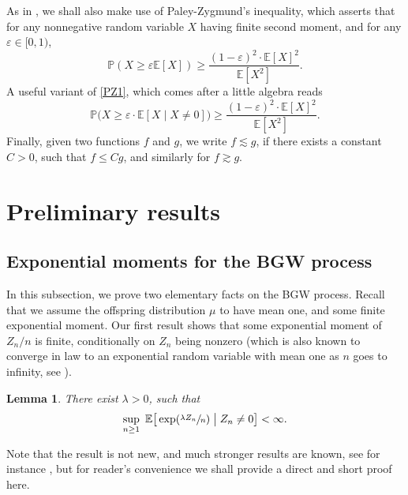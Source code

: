 \documentclass[11pt]{article}
\numberwithin{equation}{section}
\theoremstyle{plain}
\newtheorem{lemma}[theorem]{Lemma}
\theoremstyle{definition}
\newcommand{\1}{{\text{\Large $\mathfrak 1$}}}
\begin{document}
As in \cite{AHJ}, we shall also make use of Paley-Zygmund's inequality, which asserts that for any nonnegative random variable $X$ having finite second moment,
and for any $\varepsilon \in [0,1)$,
\begin{equation}\label{PZ1}
\mathbb P(X\ge \varepsilon \mathbb E[X]) \ge \frac {(1-\varepsilon)^2\cdot \mathbb E[X]^2}{\mathbb E[X^2]}.
\end{equation}
A useful variant of \eqref{PZ1}, which comes after a little
algebra reads
\begin{equation}\label{PZ}
\mathbb P\big(X\ge \varepsilon\cdot \mathbb E[X\mid X\neq 0]\big) \ge \frac {(1-\varepsilon)^2\cdot \mathbb E[X]^2}{\mathbb E[X^2]}.
\end{equation}
Finally, given two functions $f$ and $g$, we write $f\lesssim g$, if there exists a constant $C>0$, such that $f\le Cg$, and similarly for $f\gtrsim g$.

\section{Preliminary results}\label{sec-prelim}
\subsection{Exponential moments for the BGW process}
In this subsection, we prove two elementary facts on the BGW process. Recall that we assume the offspring distribution $\mu$ to have mean one, and some finite exponential moment. Our first result shows that some exponential moment of $Z_n/n$ is finite, conditionally on $Z_n$ being nonzero
(which is also known to converge in law to an exponential random variable with mean one as $n$ goes to infinity, see \cite[Th.\,2 p.\,20]{AN}).
\begin{lemma}\label{lem.BGW}
There exist $\lambda>0$, such that
\begin{equation*}%
\sup_{n\ge 1} \ \mathbb E\big[\exp(\sfrac{\lambda Z_n}{n})\bigm| Z_n\neq 0\big] < \infty.
\end{equation*}
\end{lemma}
Note that the result is not new, and much stronger results are known, see for instance \cite{NV75,NV03}, but for reader's convenience
we shall provide a direct and short proof here.
\end{document}
